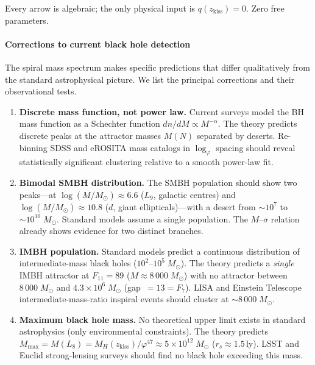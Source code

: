 \documentclass[12pt,a4paper]{article}
\begin{document}
Every arrow is algebraic; the only physical input is $q(z_{\mathrm{kiss}}) = 0$.  Zero free parameters.
\paragraph{Corrections to current black hole detection}
\label{sec:bh-corrections}

The spiral mass spectrum makes specific predictions that differ qualitatively from the standard astrophysical picture.  We list the principal corrections and their observational tests.

\begin{enumerate}

\item \textbf{Discrete mass function, not power law.}\;
Current surveys model the BH mass function as a Schechter function $dn/dM \propto M^{-\alpha}$.  The theory predicts discrete peaks at the attractor masses $M(N)$ separated by deserts.  Re-binning SDSS and eROSITA mass catalogs in $\log_\varphi$ spacing should reveal statistically significant clustering relative to a smooth power-law fit.

\item \textbf{Bimodal SMBH distribution.}\;
The SMBH population should show two peaks---at $\log(M/M_\odot) \approx 6.6$ ($L_9$, galactic centres) and $\log(M/M_\odot) \approx 10.8$ ($d$, giant ellipticals)---with a desert from $\sim\! 10^{7}$ to $\sim\! 10^{10}\;M_\odot$.  Standard models assume a single population.  The $M$--$\sigma$ relation already shows evidence for two distinct branches.

\item \textbf{IMBH population.}\;
Standard models predict a continuous distribution of intermediate-mass black holes ($10^{2}$--$10^{5}\;M_\odot$).  The theory predicts a \emph{single} IMBH attractor at $F_{11} = 89$ ($M \approx 8\,000\;M_\odot$) with no attractor between $8\,000\;M_\odot$ and $4.3 \times 10^{6}\;M_\odot$ (gap~$= 13 = F_7$).  LISA and Einstein Telescope intermediate-mass-ratio inspiral events should cluster at $\sim 8\,000\;M_\odot$.

\item \textbf{Maximum black hole mass.}\;
No theoretical upper limit exists in standard astrophysics (only environmental constraints).  The theory predicts $M_{\max} = M(L_8) = M_H(z_{\mathrm{kiss}})/\varphi^{47} \approx 5 \times 10^{12}\;M_\odot$ ($r_s \approx 1.5$\,ly).  LSST and Euclid strong-lensing surveys should find no black hole exceeding this mass.


\end{enumerate}
\end{document}
